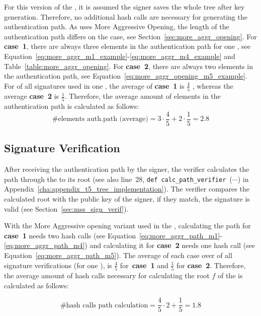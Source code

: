 For this version of the \extree, it is assumed the signer saves the whole tree  after key generation. Therefore, no additional hash calls are necessary for generating the authentication path. %
As \extree uses More Aggressive Opening, the length of the authentication path differs on the case, see Section~\ref{sec:more_aggr_opening}.
For \textbf{case~1}, there are always three elements in the authentication path for one \tfblock, see Equation~\ref{eq:more_aggr_m1_example}-\ref{eq:more_aggr_m4_example} and Table~\ref{table:more_aggr_opening}.
For \textbf{case~2}, there are always two elements in the authentication path, see Equation~\ref{eq:more_aggr_opening_m5_example}. For of all signatures used in one \extree, the average of \textbf{case~1} is $\frac{4}{5}$ , whereas the average \textbf{case~2} is $\frac{1}{5}$.
Therefore, the average amount of elements in the authentication path is calculated as follows:
\begin{equation}
\label{eq:more_aggr_len_authpath}
\text{\# elements auth.path (average)} = 3 \cdot \frac{4}{5} + 2 \cdot \frac{1}{5} = 2.8
\end{equation}

\subsection{\texorpdfstring{\extree}{Ext. T5-Tree} Signature Verification}
After receiving the authentication path by the signer, the verifier calculates the path through the \extree to its root (see also line~28, \texttt{def calc_path_verifier}~($\cdots$) in Appendix~\ref{cha:appendix_t5_tree_implementation}). The verifier compares the calculated root with the public key of the signer, if they match, the signature is valid (see Section~\ref{sec:mss_sign_verif}).

With the More Aggressive opening variant used in the \extree, calculating the path for \textbf{case~1} needs two hash calls (see Equation~\ref{eq:more_aggr_path_m1}-\ref{eq:more_aggr_path_m4}) and calculating it for \textbf{case~2} needs one hash call (see Equation~\ref{eq:more_aggr_path_m5}). The average of each case over of all signature verifications (for one \extree), is $\frac{4}{5}$ for\ \textbf{case~1} and $\frac{1}{5}$ for \textbf{case~2}. Therefore, the average amount of hash calls necessary for calculating the root $f$ of the \extree is calculated as follows:

\begin{equation}
\text{\# hash calls path calculation} = \frac{4}{5} \cdot 2 + \frac{1}{5} = 1.8
\end{equation}


